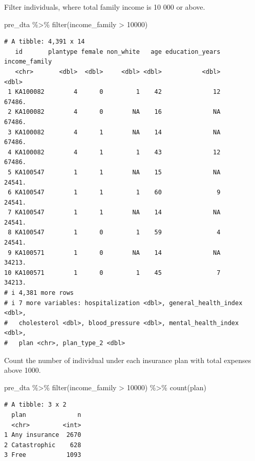 \documentclass[
  letterpaper,
  DIV=11,
  numbers=noendperiod]{scrartcl}
\newenvironment{Shaded}{\begin{snugshade}}{\end{snugshade}}
\newcommand{\DecValTok}[1]{\textcolor[rgb]{0.68,0.00,0.00}{#1}}
\newcommand{\FunctionTok}[1]{\textcolor[rgb]{0.28,0.35,0.67}{#1}}
\newcommand{\NormalTok}[1]{\textcolor[rgb]{0.00,0.23,0.31}{#1}}
\newcommand{\SpecialCharTok}[1]{\textcolor[rgb]{0.37,0.37,0.37}{#1}}
\begin{document}
Filter individuals, where total family income is 10 000 or above.

\begin{Shaded}
\begin{Highlighting}[]
\NormalTok{pre\_dta }\SpecialCharTok{\%\textgreater{}\%} \FunctionTok{filter}\NormalTok{(income\_family }\SpecialCharTok{\textgreater{}}  \DecValTok{10000}\NormalTok{)}
\end{Highlighting}
\end{Shaded}

\begin{verbatim}
# A tibble: 4,391 x 14
   id       plantype female non_white   age education_years income_family
   <chr>       <dbl>  <dbl>     <dbl> <dbl>           <dbl>         <dbl>
 1 KA100082        4      0         1    42              12        67486.
 2 KA100082        4      0        NA    16              NA        67486.
 3 KA100082        4      1        NA    14              NA        67486.
 4 KA100082        4      1         1    43              12        67486.
 5 KA100547        1      1        NA    15              NA        24541.
 6 KA100547        1      1         1    60               9        24541.
 7 KA100547        1      1        NA    14              NA        24541.
 8 KA100547        1      0         1    59               4        24541.
 9 KA100571        1      0        NA    14              NA        34213.
10 KA100571        1      0         1    45               7        34213.
# i 4,381 more rows
# i 7 more variables: hospitalization <dbl>, general_health_index <dbl>,
#   cholesterol <dbl>, blood_pressure <dbl>, mental_health_index <dbl>,
#   plan <chr>, plan_type_2 <dbl>
\end{verbatim}

Count the number of individual under each insurance plan with total
expenses above 1000.

\begin{Shaded}
\begin{Highlighting}[]
\NormalTok{pre\_dta }\SpecialCharTok{\%\textgreater{}\%} \FunctionTok{filter}\NormalTok{(income\_family }\SpecialCharTok{\textgreater{}}  \DecValTok{10000}\NormalTok{) }\SpecialCharTok{\%\textgreater{}\%} \FunctionTok{count}\NormalTok{(plan)}
\end{Highlighting}
\end{Shaded}

\begin{verbatim}
# A tibble: 3 x 2
  plan              n
  <chr>         <int>
1 Any insurance  2670
2 Catastrophic    628
3 Free           1093
\end{verbatim}
\end{document}
